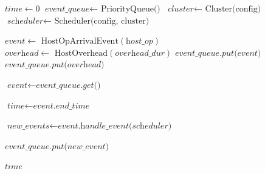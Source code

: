 \begin{algorithm}
\caption{Core Discrete-Event Simulator Algorithm}
\label{alg:simulator}
\begin{algorithmic}[1]
    \State $\textit{time} \gets 0$
    \State $\textit{event\_queue} \gets \text{ PriorityQueue()}$
    \State $\textit{cluster} \gets \text{ Cluster(config)}$
    \State $\textit{scheduler} \gets \text{ Scheduler(config, cluster)}$
    
    \Statex {}
        \State $\textit{event} \gets \text{ HostOpArrivalEvent}(\textit{host\_op})$
        \State $\textit{overhead} \gets \text{ HostOverhead}(\textit{overhead\_dur})$
        \State $\textit{event\_queue.put(event)}$
        \State $\textit{event\_queue.put(overhead)}$

    \EndFor
    
    \Statex
        \State $\textit{event} \gets \textit{event\_queue.get()}$
        
        \Statex {}
        \State $\textit{time} \gets \textit{event.end\_time}$
        
        \Statex {}
        \State $\textit{new\_events} \gets \textit{event.handle\_event(scheduler)}$
        
            \State $\textit{event\_queue.put(new\_event)}$
        \EndFor
        
    \EndWhile
    
    \Statex
    \Return $\textit{time}$
\EndProcedure
\end{algorithmic}
\end{algorithm}

